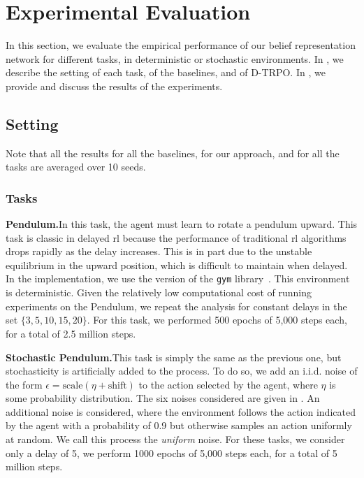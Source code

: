 \section{Experimental Evaluation}
\label{sec:exp_belief}

In this section, we evaluate the empirical performance of our belief representation network for different tasks, in deterministic or stochastic environments. 
In , we describe the setting of each task, of the baselines, and of D-TRPO. 
In , we provide and discuss the results of the experiments.

\subsection{Setting}
\label{subsec:setting_exp_belief}

Note that all the results for all the baselines, for our approach, and for all the tasks are averaged over 10 seeds.

\subsubsection{Tasks}
\label{subsubsec:tasks}
\noindent\textbf{Pendulum.}\indent In this task, the agent must learn to rotate a pendulum upward. 
This task is classic in delayed \gls{rl} because the performance of traditional \gls{rl} algorithms drops rapidly as the delay increases. 
This is in part due to the unstable equilibrium in the upward position, which is difficult to maintain when delayed. 
In the implementation, we use the version of the \texttt{gym} library~\cite{brockman2016gym}.
This environment is deterministic. 
Given the relatively low computational cost of running experiments on the Pendulum, we repeat the analysis for constant delays in the set $\{3, 5, 10, 15, 20\}$.
For this task, we performed 500 epochs of 5,000 steps each, for a total of 2.5 million steps.

\noindent\textbf{Stochastic Pendulum.}\indent This task is simply the same as the previous one, but stochasticity is artificially added to the process. 
To do so, we add an i.i.d. noise of the form $\epsilon = \text{scale}( \eta+ \text{shift})$ to the action selected by the agent, where $\eta$ is some probability distribution.
The six noises considered are given in . 
An additional noise is considered, where the environment follows the action indicated by the agent with a probability of 0.9 but otherwise samples an action uniformly at random. 
We call this process the \emph{uniform} noise.
For these tasks, we consider only a delay of 5, we perform 1000 epochs of 5,000 steps each, for a total of 5 million steps.

